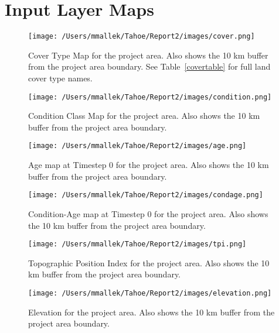 \section{Input Layer Maps}
\label{app:sec:inputmaps}

\begin{figure}[!htbp]
\centering
\texttt{[image: /Users/mmallek/Tahoe/Report2/images/cover.png]}
\caption{Cover Type Map for the project area. Also shows the 10 km buffer from the project area boundary. See Table~\ref{covertable} for full land cover type names.}
\end{figure}

\begin{figure}[!htbp]
\centering
\texttt{[image: /Users/mmallek/Tahoe/Report2/images/condition.png]}
\caption{Condition Class Map for the project area. Also shows the 10 km buffer from the project area boundary.} 
\label{conditionmap}
\end{figure}

\begin{figure}[htbp]
\centering
\texttt{[image: /Users/mmallek/Tahoe/Report2/images/age.png]}
\caption{Age map at Timestep 0 for the project area. Also shows the 10 km buffer from the project area boundary.} 
\label{agemap}
\end{figure}

\begin{figure}[htbp]
\centering
\texttt{[image: /Users/mmallek/Tahoe/Report2/images/condage.png]}
\caption{Condition-Age map at Timestep 0 for the project area. Also shows the 10 km buffer from the project area boundary.} 
\label{condagemap}
\end{figure}

\begin{figure}[htbp]
\centering
\texttt{[image: /Users/mmallek/Tahoe/Report2/images/tpi.png]}
\caption{Topographic Position Index for the project area. Also shows the 10 km buffer from the project area boundary.} 
\label{tpimap}
\end{figure}

\begin{figure}[htbp]
\centering
\texttt{[image: /Users/mmallek/Tahoe/Report2/images/elevation.png]}
\caption{Elevation for the project area. Also shows the 10 km buffer from the project area boundary.} 
\label{elevationmap}
\end{figure}

